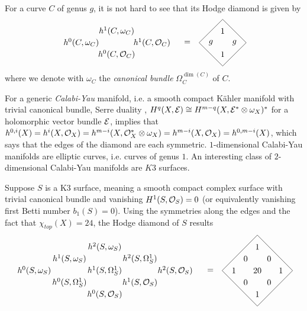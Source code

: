 \documentclass[../main.tex]{subfiles}
\begin{document}
\begin{es} For a curve $C$ of genus $g$, it is not hard to see that its Hodge diamond is given by
\[
\begin{tikzpicture}[scale=1]
\draw (-1.5,0) node          {$h^1(C,\calO_C)$};
\draw (-4.5,0) node         {$h^0(C,\omega_C)$};
\draw (-3,0.5) node          {$h^1(C,\omega_C)$};
\draw (-3,-0.5) node         {$ h^0(C,\calO_C)$};
\draw (0,0) node         {$=$};
\draw (2,0) node              {$g$};
\draw (1,0) node             {$g$};
\draw (1.5,0.5) node              {$1$};
\draw (1.5,-0.5) node             {$1$};
\draw (2.5,0) -- (1.5,1) -- (0.5,0) -- (1.5, -1) -- cycle;
\end{tikzpicture}
\]
where we denote with $\omega_C$ the \emph{canonical bundle} $\Omega^{\dim(C)}_C$ of $C$.
\end{es}

For a generic \emph{Calabi-Yau} manifold, i.e. a smooth compact  K\"{a}hler manifold with trivial canonical bundle, Serre duality  \cite[Thm. 5.32]{Voi07}, $H^q(X,\mathcal{E}) \cong H^{m-q}(X,\mathcal{E}^* \otimes \omega_X )^*$ for a holomorphic vector bundle $\mathcal{E}$, implies that $h^{0,i}(X)=h^i(X,\mathcal{O}_X)=h^{m-i}(X,\mathcal{O}_X^* \otimes\omega_X) =h^{m-i}(X,\mathcal{O}_X)= h^{0,m-i}(X)  $, which says that the edges of the diamond are each symmetric.
$1$-dimensional Calabi-Yau manifolds are elliptic curves, i.e. curves of genus $1$. An interesting class of $2$-dimensional Calabi-Yau manifolds are $K3$ surfaces.

\begin{es} \label{K3Hodgeex} Suppose $S$ is a K3 surface, meaning a smooth compact complex surface with trivial canonical bundle and vanishing $H^1(S,\mathcal{O}_S) = 0$ (or equivalently vanishing first Betti number $b_1(S)=0$). Using the symmetries along the edges and the fact that $\chi_{top}(X)=24$, the Hodge diamond of $S$ results 
\[
\begin{tikzpicture}[scale=1]
\draw (-5,0) node         {$h^0(S,\omega_S)$};
\draw (-2,0) node          {$h^1(S,\Omega^1_S)$};
\draw (1,0) node         {$h^2(S,\calO_S)$};
\draw (-3.5,0.5) node          {$h^1(S,\omega_S)$};
\draw (-0.5,0.5) node          {$h^2(S,\Omega^1_S)$};
\draw (-3.5,-0.5) node         {$ h^0(S,\Omega^1_S)$};
\draw (-0.5,-0.5) node         {$ h^1(S,\calO_S)$};
\draw (-2,1) node          {$h^2(S,\omega_S)$};
\draw (-2,-1) node         {$h^0(S,\calO_S)$};
\draw (2.5,0) node         {$=$};
\draw (3.5,0) node               {$1$};
\draw (4.5,0) node               {$20$};
\draw (5.5,0) node               {$1$};
\draw (4,0.5) node              {$0$};
\draw (5,0.5) node              {$0$};
\draw (4,-0.5) node             {$0$};
\draw (5,-0.5) node             {$0$};
\draw (4.5,1) node               {$1$};
\draw (4.5,-1) node              {$1$};
\draw (6,0) -- (4.5,1.5) -- (3,0) -- (4.5, -1.5) -- cycle;
\end{tikzpicture}
\]


\end{es}
\end{document}
